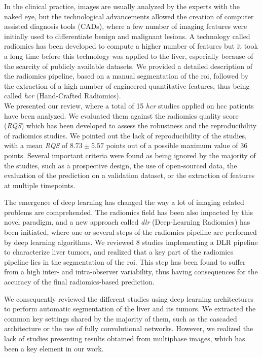 In the clinical practice, images are usually analyzed by the experts
with the naked eye, but the technological advancements allowed the
creation of computer assisted diagnosis tools (CADs), where a few number
of imaging features were initially used to differentiate benign and
malignant lesions.
A technology called radiomics has been developed to compute a higher
number of features but it took a long time before this technology was
applied to the liver, especially because of the scarcity of publicly
available datasets. We provided a detailed description of the radiomics pipeline, based on a manual segmentation of the \ac{roi}, followed by the extraction of a high number of engineered quantitative features, thus being called \emph{\ac{hcr}} (Hand-Crafted Radiomics).\\
We presented our review, where a total of 15 \emph{\ac{hcr}} studies
applied on \ac{hcc} patients have been analyzed.
We evaluated them against the radiomics quality score (\emph{RQS})
which has been developed to assess the robustness and the
reproducibility of radiomics studies.
We pointed out the lack of reproducibility of the studies, with a mean
\emph{RQS} of  $8.73 \pm 5.57$  points out of a possible maximum value of 36 points. Several important criteria were found as being ignored by the majority of the studies, such as a prospective design, the use of open-sourced data, the evaluation of the prediction on a validation dataset, or the extraction of features at multiple timepoints.

The emergence of deep learning has changed the way a lot of imaging
related problems are comprehended.
The radiomics field has been also impacted by this novel paradigm, and a new approach called \emph{\ac{dlr}} (Deep-Learning
Radiomics) has been initiated, where one or several steps of the
radiomics pipeline are performed by deep learning algorithms.
We reviewed 8 studies implementing a DLR pipeline to characterize liver tumors, and realized that a key part of the radiomics pipeline lies in the segmentation of the \ac{roi}. This step has been found to suffer from a high inter- and intra-observer variability, thus having consequences for the accuracy of the final radiomics-based prediction. 

We consequently reviewed the different studies using deep learning architectures to perform automatic segmentation of the liver and its tumors. We extracted the common key settings shared by the majority of them, such as the cascaded architecture or the use of fully convolutional networks. However, we realized the lack of studies presenting results obtained from multiphase images, which has been a key element in our work. 

